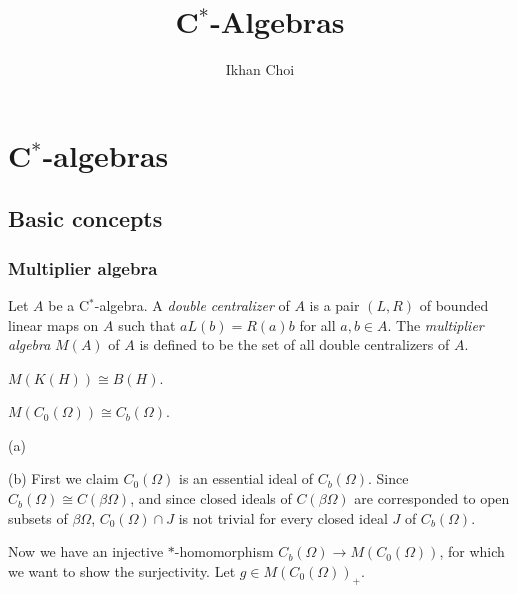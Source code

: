 \documentclass{../../large}
\begin{document}
\title{C$^*$-Algebras}
\author{Ikhan Choi}
\maketitle
\tableofcontents

\part{C$^*$-algebras}
\chapter{Basic concepts}

\section{Multiplier algebra}

\begin{prb}
Let $A$ be a C$^*$-algebra.
A \emph{double centralizer} of $A$ is a pair $(L,R)$ of bounded linear maps on $A$ such that $aL(b)=R(a)b$ for all $a,b\in A$.
The \emph{multiplier algebra} $M(A)$ of $A$ is defined to be the set of all double centralizers of $A$.
\end{prb}
\begin{prb}
	
\end{prb}

\begin{prb}
\end{prb}


\begin{prb}
\begin{parts}
\item $M(K(H))\cong B(H)$.
\item $M(C_0(\Omega))\cong C_b(\Omega)$.
\end{parts}
\end{prb}
\begin{pf}
(a)

(b)
First we claim $C_0(\Omega)$ is an essential ideal of $C_b(\Omega)$.
Since $C_b(\Omega)\cong C(\beta\Omega)$, and since closed ideals of $C(\beta\Omega)$ are corresponded to open subsets of $\beta\Omega$, $C_0(\Omega)\cap J$ is not trivial for every closed ideal $J$ of $C_b(\Omega)$.

Now we have an injective $*$-homomorphism $C_b(\Omega)\to M(C_0(\Omega))$, for which we want to show the surjectivity.
Let $g\in M(C_0(\Omega))_+$.
\end{pf}
\end{document}
